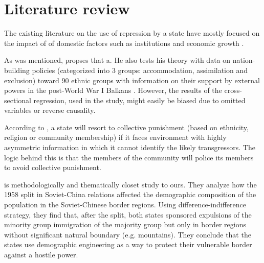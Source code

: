\documentclass[12pt]{article}
\begin{document}






\section{Literature review}
The existing literature on the use of repression by a state have mostly focused on the impact of  of domestic factors such as institutions and economic growth \citep{davenport_state_2007, davenport_state_2007-1}.

As was mentioned, \citet{mylonas_politics_2013} propses that a. He also tests his theory with data on nation-building policies (categorized into 3 groups: accommodation, assimilation and exclusion)  toward  90 ethnic groups with information on their support by external powers in the post-World War I Balkans . However, the results of the cross-sectional regression, used in the study, might easily be biased due to omitted variables or reverse causality. 

According to \citet{blaydes_state_2018}, a state will resort to collective punishment (based on ethnicity, religion or community membership) if it faces environment with highly asymmetric information in which it cannot identify the likely transgressors. The logic behind this is that the members of the community will police its members to avoid collective punishment. 

\citet{mcnamee_demographic_nodate} is methodologically and thematically closet study to ours. They analyze how the 1958 split in Soviet-China relations affected the demographic composition of the population in the Soviet-Chinese border regions.
Using difference-indifference strategy, they find that, after the split,  both states sponsored expulsions  of the minority group  immigration of the majority group but only in border regions without significant natural boundary (e.g. mountains). They conclude that the states use demographic engineering as a way to protect their vulnerable border against a hostile power. 
\end{document}
